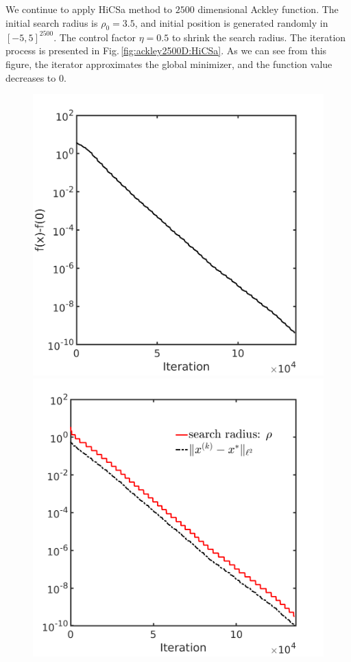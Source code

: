 \documentclass[final,1p,times]{elsarticle}
\begin{document}
\newpage

We continue to apply HiCSa method to $2500$ dimensional
Ackley function. The initial search radius is $\rho_0=3.5$, and
initial position is generated randomly in $[-5,5]^{2500}$. 
The control factor $\eta=0.5$ to shrink the search radius. 
The iteration process is presented
in Fig.\,\ref{fig:ackley2500D:HiCSa}. As we can see from this
figure, the iterator approximates the global minimizer, and the
function value decreases to $0$.
\begin{figure}[!htbp] 
	\centering
	\includegraphics[scale=0.2]{../figures/ackley2500D.png}
	\includegraphics[scale=0.2]{../figures/ackley2500D_dist.png}

\end{figure}
\end{document}
